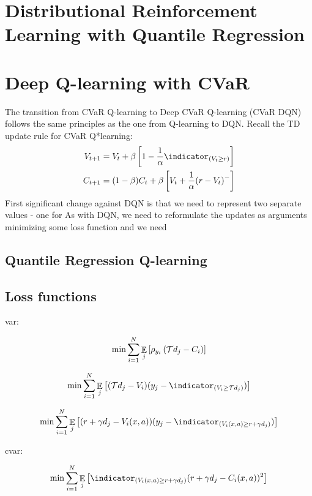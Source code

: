 \section{Distributional Reinforcement Learning with Quantile Regression}

\section{Deep Q-learning with CVaR}
The transition from CVaR Q-learning to Deep CVaR Q-learning (CVaR DQN) follows the same principles as the one from Q-learning to DQN. Recall the TD update rule for CVaR Q*learning:
\begin{align*}
V_{t+1} &= V_{t} + \beta \bsquare{1-\dfrac{1}{\alpha}\indicator_{(V_t \ge r)}}\\
C_{t+1} &= (1-\beta)C_t + \beta \bsquare{V_t + \dfrac{1}{\alpha}(r-V_t)^-}
\end{align*}
First significant change against DQN is that we need to represent two separate values - one for 
As with DQN, we need to reformulate the updates as arguments minimizing some loss function and we need 
\subsection{Quantile Regression Q-learning}


\subsection{Loss functions}

var:

\begin{equation}
\min \sum_{i=1}^{N} \mathop{\mathbb{E}}_j\left[ {\rho_{y_i}\left( {\mathcal{T} d_j - C_i} \right)} \right]
\end{equation}

\begin{equation}
\min \sum_{i=1}^{N} \expect_j\bsquare{(\cT d_j - V_i)(y_j - \indicator_{(V_i \ge \cT d_j)})}
\end{equation}

\begin{equation}
\min \sum_{i=1}^{N} \expect_j\bsquare{(r + \gamma d_j - V_i(x, a))(y_j - \indicator_{(V_i(x, a) \ge r + \gamma d_j)})}
\end{equation}


cvar:

\begin{equation}
\min \sum_{i=1}^{N} \expect_j\bsquare{\indicator_{(V_i(x, a) \ge r + \gamma d_j)}(r + \gamma d_j - C_i(x, a))^2}
\end{equation}


